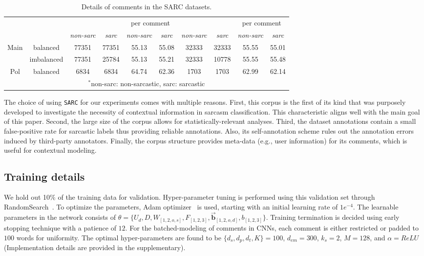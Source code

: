 \documentclass[11pt]{article}
\begin{document}
{\begin{table}[h!]
\begin{center}
\begin{tabular}{c|c|c|c|c|c|c|c|c|c}
            \multicolumn{2}{c|}{}&\multicolumn{2}{c|}{}&\multicolumn{2}{c|}{per comment}&\multicolumn{2}{c|}{}&\multicolumn{2}{c}{per comment}\\\cline{3-10}
		   	\multicolumn{2}{c|}{}&\textit{non-sarc}&\textit{sarc}&\textit{non-sarc}&\textit{sarc}&\textit{non-sarc}&\textit{sarc}&\textit{non-sarc}&\textit{sarc}\\ 
            \hline \hline
            \multirow{2}{*}{Main}&balanced&77351&77351&55.13&55.08&32333&32333&55.55&55.01\\
            &imbalanced&77351&25784&55.13&55.21&32333&10778&55.55&55.48\\ \cline{2-2}
            Pol&balanced&6834&6834&64.74&62.36&1703&1703&62.99&62.14\\
            \hline
            \multicolumn{10}{c}{\footnotesize{$^*$non-sarc: non-sarcastic, sarc: sarcastic}}
		\end{tabular}
	\end{center}
	\vspace{-0.4cm}
	\caption {Details of comments in the SARC datasets.}
	\label{table:SARCstats}
\end{table} 

The choice of using \verb|SARC| for our experiments comes with multiple reasons. First, this corpus is the first of its kind that was purposely developed to investigate the necessity of contextual information in sarcasm classification. This characteristic aligns well with the main goal of this paper. Second, the large size of the corpus allows for statistically-relevant analyses. Third, the dataset annotations contain a small false-positive rate for sarcastic labels thus providing reliable annotations. Also, its self-annotation scheme rules out the annotation errors induced by third-party annotators. Finally, the corpus structure provides meta-data (e.g., user information) for its comments, which is useful for contextual modeling.

\subsection{Training details} \label{sec:training}
We hold out 10\% of the training data for validation. Hyper-parameter tuning is performed using this validation set through RandomSearch~\cite{bergstra2012random}. To optimize the parameters, Adam optimizer~\cite{kingma2014adam} is used, starting with an initial learning rate of $1e^{-4}$. The learnable parameters in the network consists of $\theta = \{ U_d, D, W_{[1,2,o,s]}, F_{[1,2,3]}, \vec{\textbf{b}}_{[1,2,o,d]}, b_{[1,2,3]} \}$. Training termination is decided using early stopping technique with a patience of $12$. For the batched-modeling of comments in CNNs, each comment is either restricted or padded to $100$ words for uniformity. The optimal hyper-parameters are found to be $\{d_s, d_p, d_t, K\} = 100$, $d_{em} = 300$, $k_s = 2$, $M = 128$, and $\alpha = ReLU$ (Implementation details are provided in the supplementary).







}
\end{document}
